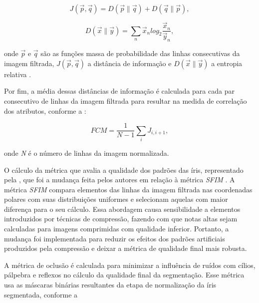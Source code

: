 \begin{equation} \label{eq:fce:fcm3}
    J(\vec{p},\vec{q}) = D(\vec{p}\parallel\vec{q}) + D(\vec{q}\parallel\vec{p}),
\end{equation}

\begin{equation} \label{eq:fce:fcm4}
    D(\vec{x}\parallel\vec{y}) = \sum_{n}\vec{x}_{n}log_{2}\frac{\vec{x}_{n}}{\vec{y}_{n}},
\end{equation}

\noindent onde $\vec{p}$ e $\vec{q}$ são as funções massa de probabilidade das linhas consecutivas da imagem filtrada, $J(\vec{p},\vec{q})$ a distância de informação e $D(\vec{x}\parallel\vec{y})$ a entropia relativa \cite{Mackay2002-RelativeEntropy}.

\par Por fim, a média dessas distâncias de informação é calculada para cada par consecutivo de linhas da imagem filtrada para resultar na medida de correlação dos atributos, conforme a  \cite{du2010}:

\begin{equation}\label{eq:fce:fcm5}
    FCM = \frac{1}{N - 1}\sum_{i}J_{i, i+1},
\end{equation}

\noindent onde \textit{N} é o número de linhas da imagem normalizada. 

\par O cálculo da métrica que avalia a qualidade dos padrões das íris, representado pela , que foi a mudança feita pelos autores em relação à métrica \textit{\acrshort{SFIM}} \cite{belcher2008}. A métrica \textit{\acrshort{SFIM}} compara elementos das linhas da imagem filtrada nas coordenadas polares com suas distribuições uniformes e selecionam aquelas com maior diferença para o seu cálculo. Essa abordagem causa sensibilidade a elementos introduzidos por técnicas de compressão, fazendo com que notas altas sejam calculadas para imagens comprimidas com qualidade inferior. Portanto, a mudança foi implementada para reduzir os efeitos dos padrões artificiais produzidos pela compressão e deixar a métrica de qualidade final mais robusta.

\par A métrica de oclusão é calculada para minimizar a influência de ruídos com cílios, pálpebra e reflexos no cálculo da qualidade final da segmentação. Esse métrica usa as máscaras binárias resultantes da etapa de normalização da íris segmentada, conforme a  \cite{du2010}

